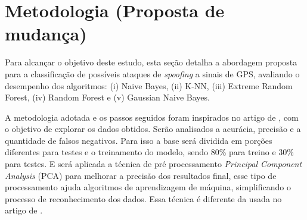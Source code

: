 \documentclass[12pt]{article}
\begin{document}
\section{Metodologia (Proposta de mudança)}

Para alcançar o objetivo deste estudo, esta seção detalha a abordagem proposta para a classificação de possíveis ataques de \textit{spoofing} 
a sinais de GPS, avaliando o desempenho dos algoritmos: (i) Naive Bayes, (ii) K-NN, (iii) Extreme Random Forest, (iv) Random Forest e (v)  Gaussian Naive Bayes. 

A metodologia adotada e os passos seguidos foram inspirados no artigo de \cite{Aissou2021}, com o objetivo de explorar os dados obtidos. Serão analisados a acurácia, 
precisão e a quantidade de falsos negativos. 
Para isso a base será dividida em porções diferentes para testes e o treinamento do modelo, sendo 80\% para treino e 30\% para testes. E será aplicada a técnica de pré processamento 
\textit{Principal Component Analysis} (PCA) para melhorar a precisão dos resultados final, esse tipo de processamento ajuda algoritmos de aprendizagem de máquina, simplificando o processo de reconhecimento dos dados.  Essa técnica é
diferente da usada no artigo de \cite{Aissou2021}.








\end{document}

